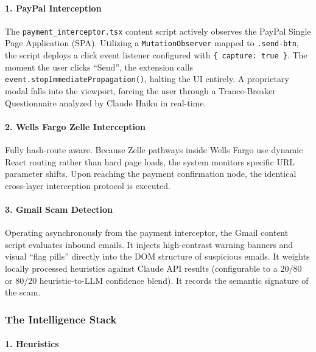 \documentclass[
]{article}
\begin{document}
\paragraph{1. PayPal Interception}\label{paypal-interception}

The \texttt{payment\_interceptor.tsx} content script actively observes
the PayPal Single Page Application (SPA). Utilizing a
\texttt{MutationObserver} mapped to \texttt{.send-btn}, the script
deploys a click event listener configured with
\texttt{\{\ capture:\ true\ \}}. The moment the user clicks ``Send'',
the extension calls \texttt{event.stopImmediatePropagation()}, halting
the UI entirely. A proprietary modal falls into the viewport, forcing
the user through a Trance-Breaker Questionnaire analyzed by Claude Haiku
in real-time.

\paragraph{2. Wells Fargo Zelle
Interception}\label{wells-fargo-zelle-interception}

Fully hash-route aware. Because Zelle pathways inside Wells Fargo use
dynamic React routing rather than hard page loads, the system monitors
specific URL parameter shifts. Upon reaching the payment confirmation
node, the identical cross-layer interception protocol is executed.

\paragraph{3. Gmail Scam Detection}\label{gmail-scam-detection}

Operating asynchronously from the payment interceptor, the Gmail content
script evaluates inbound emails. It injects high-contrast warning
banners and visual ``flag pills'' directly into the DOM structure of
suspicious emails. It weights locally processed heuristics against
Claude API results (configurable to a 20/80 or 80/20 heuristic-to-LLM
confidence blend). It records the semantic signature of the scam.

\subsubsection{The Intelligence Stack}\label{the-intelligence-stack}

\paragraph{1. Heuristics}\label{heuristics}
\end{document}
